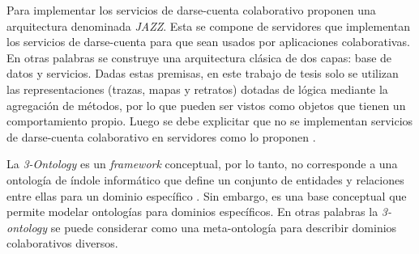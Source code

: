 Para implementar los servicios de darse-cuenta colaborativo \cite{Leiva:2002} proponen una arquitectura denominada \textit{JAZZ}. Esta se compone de servidores que implementan los servicios de darse-cuenta para que sean usados por aplicaciones colaborativas. En otras palabras se construye una arquitectura clásica de dos capas: base de datos y servicios. Dadas estas premisas, en este trabajo de tesis solo se utilizan las representaciones (trazas, mapas y retratos) dotadas de lógica mediante la agregación de métodos, por lo que pueden ser vistos como objetos que tienen un comportamiento propio. Luego se debe explicitar que no se implementan servicios de darse-cuenta colaborativo en servidores como lo proponen \cite{Leiva:2002}.

La \textit{3-Ontology} es un \textit{framework} conceptual, por lo tanto, no corresponde a una ontología de índole informático que define un conjunto de entidades y relaciones entre ellas para un dominio específico \citep{Leiva:2002}. Sin embargo, es una base conceptual que permite modelar ontologías para dominios específicos. En otras palabras la \textit{3-ontology} se puede considerar como una meta-ontología para describir dominios colaborativos diversos.

%










